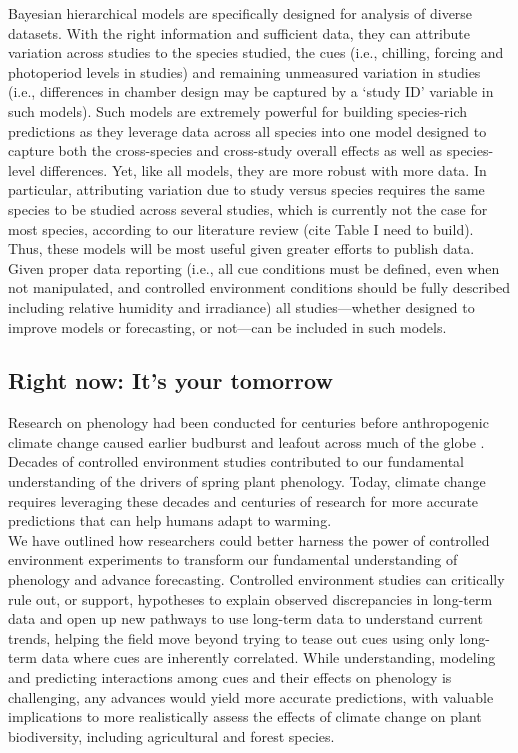 \documentclass[11pt,letter]{article}
\begin{document}
Bayesian hierarchical models are specifically designed for analysis of diverse datasets. With the right information and sufficient data, they can attribute variation across studies to the species studied, the cues (i.e., chilling, forcing and photoperiod levels in studies) and remaining unmeasured variation in studies (i.e., differences in chamber design may be captured by a `study ID' variable in such models). Such models are extremely powerful for building species-rich predictions as they leverage data across all species into one model designed to capture both the cross-species and cross-study overall effects as well as species-level differences. Yet, like all models, they are more robust with more data. In particular, attributing variation due to study versus species requires the same species to be studied across several studies, which is currently not the case for most species, according to our literature review (cite Table I need to build). Thus, these models will be most useful given greater efforts to publish data. Given proper data reporting (i.e., all cue conditions must be defined, even when not manipulated, and controlled environment conditions should be fully described including relative humidity and irradiance) all studies---whether designed to improve models or forecasting, or not---can be included in such models. 

\subsection{Right now: It's your tomorrow}
Research on phenology had been conducted for centuries before anthropogenic climate change caused earlier budburst and leafout across much of the globe \citep{Sparks:1995mv}. Decades of controlled environment studies contributed to our fundamental understanding of the drivers of spring plant phenology. Today, climate change requires leveraging these decades and centuries of research for more accurate predictions that can help humans adapt to warming. \\

We have outlined how researchers could better harness the power of controlled environment experiments to transform our fundamental understanding of phenology and advance forecasting. Controlled environment studies can critically rule out, or support, hypotheses to explain observed discrepancies in long-term data and open up new pathways to use long-term data to understand current trends, helping the field move beyond trying to tease out cues using only long-term data where cues are inherently correlated. While understanding, modeling and predicting interactions among cues and their effects on phenology is challenging, any advances would yield more accurate predictions, with valuable implications to more realistically assess the effects of climate change on plant biodiversity, including agricultural and forest species. 
\end{document}
